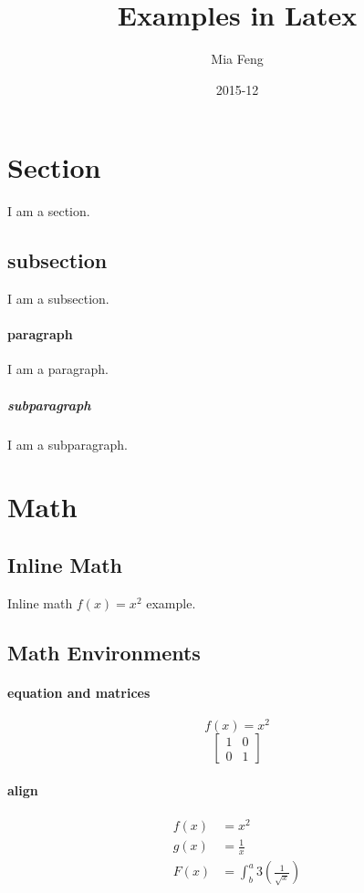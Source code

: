 \documentclass{article}
\title{Examples in Latex}
\date{2015-12}
\author{Mia Feng}
\begin{document}
	\maketitle
	\tableofcontents
	\newpage

	\section{Section}
	I am a section.
	\subsection{subsection}
	I am a subsection.
	\paragraph{paragraph}
	I am a paragraph.
	\subparagraph{subparagraph}
	I am a subparagraph.
	

	\section{Math}
	\subsection{Inline Math}
	Inline math $f(x) = x^2$ example.
	\subsection{Math Environments}
	\paragraph{equation and matrices}
	\begin{equation*}
		f(x) = x^2
	\end{equation*}
	\begin{equation}
		\left[
		\begin{matrix}
		1 & 0\\
		0 & 1
		\end{matrix}
		\right]
	\end{equation}
	
	\paragraph{align}
	\begin{align*}
		f(x) &= x^2\\
		g(x) &= \frac{1}{x}\\
		F(x) &= \int^a_b 3\left(\frac{1}{\sqrt{x}}\right)
	\end{align*}
	
\end{document}
